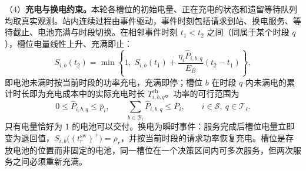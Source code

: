 \documentclass[12pt,a4paper,UTF8]{ctexart}
\begin{document}
（4）\textbf{充电与换电约束。}本轮各槽位的初始电量、正在充电的状态和遗留等待队列均取真实观测。站内连续过程由事件驱动，事件时刻包括请求到站、换电服务、等待截止、电池充满与时段切换。在相邻事件时刻 $t_1<t_2$ 之间（同属于某个时段 $q$），槽位电量线性上升、充满即止：
\begin{equation}
S_{i,b}(t_2)
=
\min\left\{
1,\;
S_{i,b}(t_1)
+
\frac{\eta_i\widehat P_{i,b,q}}{E_B}(t_2-t_1)
\right\},
\label{eq:event_charging_transition}
\end{equation}
即电池未满时按当前时段的功率充电，充满即停；槽位 $b$ 在时段 $q$ 内未满电的累计时长即为充电成本中的实际充电时长 $T_{i,b,q}^{\mathrm{ch}}$。功率的可行范围为
\begin{equation}
0\le \widehat P_{i,b,q}\le\overline p_i,
\qquad
\sum_{b\in\mathcal B_i}\widehat P_{i,b,q}
\le\overline P_i,
\qquad i\in\mathcal S,\ q\in\mathcal T_\ell.
\label{eq:power_projection}
\end{equation}
只有电量恰好为 $1$ 的电池可以交付。换电为瞬时事件：服务完成后槽位电量立即变为退回值，$S_{i,b}\big((t_r^{\mathrm{sw}})^+\big)=\rho_r$，并按当前时段的请求功率恢复充电。槽位是存放电池的位置而非固定的电池，同一槽位在一个决策区间内可多次服务，但两次服务之间必须重新充满。
\end{document}
